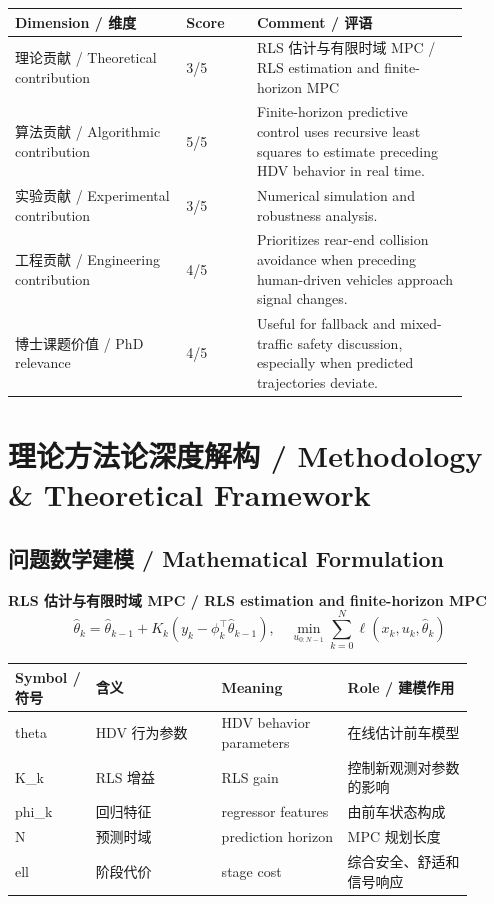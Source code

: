 \documentclass[UTF8,a4paper,11pt,fontset=fandol]{ctexart}
\begin{document}
\begin{longtable}{p{0.34\linewidth}p{0.14\linewidth}p{0.42\linewidth}}
\toprule
Dimension / 维度 & Score & Comment / 评语\\
\midrule
理论贡献 / Theoretical contribution & 3/5 & RLS 估计与有限时域 MPC / RLS estimation and finite-horizon MPC \\
算法贡献 / Algorithmic contribution & 5/5 & Finite-horizon predictive control uses recursive least squares to estimate preceding HDV behavior in real time. \\
实验贡献 / Experimental contribution & 3/5 & Numerical simulation and robustness analysis. \\
工程贡献 / Engineering contribution & 4/5 & Prioritizes rear-end collision avoidance when preceding human-driven vehicles approach signal changes. \\
博士课题价值 / PhD relevance & 4/5 & Useful for fallback and mixed-traffic safety discussion, especially when predicted trajectories deviate. \\
\bottomrule
\end{longtable}

\section{理论方法论深度解构 / Methodology \& Theoretical Framework}
\subsection{问题数学建模 / Mathematical Formulation}
\textbf{RLS 估计与有限时域 MPC / RLS estimation and finite-horizon MPC}
\[
\hat\theta_k=\hat\theta_{k-1}+K_k(y_k-\phi_k^\top\hat\theta_{k-1}),\quad \min_{u_{0:N-1}}\sum_{k=0}^{N}\ell(x_k,u_k,\hat\theta_k)
\]
\begin{longtable}{p{0.16\linewidth}p{0.25\linewidth}p{0.25\linewidth}p{0.25\linewidth}}
\toprule
Symbol / 符号 & 含义 & Meaning & Role / 建模作用\\
\midrule
theta & HDV 行为参数 & HDV behavior parameters & 在线估计前车模型 \\
K\_k & RLS 增益 & RLS gain & 控制新观测对参数的影响 \\
phi\_k & 回归特征 & regressor features & 由前车状态构成 \\
N & 预测时域 & prediction horizon & MPC 规划长度 \\
ell & 阶段代价 & stage cost & 综合安全、舒适和信号响应 \\
\bottomrule
\end{longtable}
\end{document}
